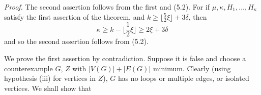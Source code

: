 \textit{Proof.} The second assertion follows from the first and (5.2). For if $\mu, \kappa, H_1, \dots, H_\kappa$ satisfy the first assertion of the theorem, and $k \ge \lfloor \frac{5}{2}\xi \rfloor + 3\delta$, then
\begin{equation*}
\kappa \ge k - \lfloor \frac{1}{2}\xi \rfloor \ge 2\xi + 3\delta
\end{equation*}
and so the second assertion follows from (5.2).

We prove the first assertion by contradiction. Suppose it is false and choose a counterexample $G$, $Z$ with $|V(G)| + |E(G)|$ minimum. Clearly (using hypothesis (iii) for vertices in $Z$), $G$ has no loops or multiple edges, or isolated vertices. We shall show that
